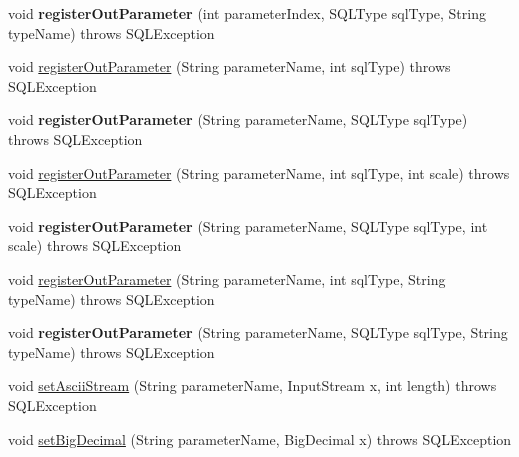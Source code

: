 \begin{DoxyCompactItemize}
\mbox{\label{classcom_1_1mysql_1_1cj_1_1jdbc_1_1_callable_statement_ace571cca0105d534b9292c74b182a98b}} 
void {\bfseries register\+Out\+Parameter} (int parameter\+Index, S\+Q\+L\+Type sql\+Type, String type\+Name)  throws S\+Q\+L\+Exception 
\item 
void \mbox{\hyperlink{classcom_1_1mysql_1_1cj_1_1jdbc_1_1_callable_statement_a0fad8371936ac7040051d7158cea4024}{register\+Out\+Parameter}} (String parameter\+Name, int sql\+Type)  throws S\+Q\+L\+Exception 
\item 
\mbox{\label{classcom_1_1mysql_1_1cj_1_1jdbc_1_1_callable_statement_a8dea8bf7c641c3b819ac3442f5a515d5}} 
void {\bfseries register\+Out\+Parameter} (String parameter\+Name, S\+Q\+L\+Type sql\+Type)  throws S\+Q\+L\+Exception 
\item 
void \mbox{\hyperlink{classcom_1_1mysql_1_1cj_1_1jdbc_1_1_callable_statement_ac0d18bc90e504b9bc2d2ba65c6562223}{register\+Out\+Parameter}} (String parameter\+Name, int sql\+Type, int scale)  throws S\+Q\+L\+Exception 
\item 
\mbox{\label{classcom_1_1mysql_1_1cj_1_1jdbc_1_1_callable_statement_a9d30fa877a6d476dc33a1bfe99ec7b2f}} 
void {\bfseries register\+Out\+Parameter} (String parameter\+Name, S\+Q\+L\+Type sql\+Type, int scale)  throws S\+Q\+L\+Exception 
\item 
void \mbox{\hyperlink{classcom_1_1mysql_1_1cj_1_1jdbc_1_1_callable_statement_a5c95bebcfabf37c4d4cf1f054e5b2278}{register\+Out\+Parameter}} (String parameter\+Name, int sql\+Type, String type\+Name)  throws S\+Q\+L\+Exception 
\item 
\mbox{\label{classcom_1_1mysql_1_1cj_1_1jdbc_1_1_callable_statement_ad8565f92c6e3673ea330998a6f0b812d}} 
void {\bfseries register\+Out\+Parameter} (String parameter\+Name, S\+Q\+L\+Type sql\+Type, String type\+Name)  throws S\+Q\+L\+Exception 
\item 
void \mbox{\hyperlink{classcom_1_1mysql_1_1cj_1_1jdbc_1_1_callable_statement_a69641688613693dda99a792231cdb153}{set\+Ascii\+Stream}} (String parameter\+Name, Input\+Stream x, int length)  throws S\+Q\+L\+Exception 
\item 
void \mbox{\hyperlink{classcom_1_1mysql_1_1cj_1_1jdbc_1_1_callable_statement_a4a068a406dc0362622e2204d21a8e70a}{set\+Big\+Decimal}} (String parameter\+Name, Big\+Decimal x)  throws S\+Q\+L\+Exception 

\end{DoxyCompactItemize}
